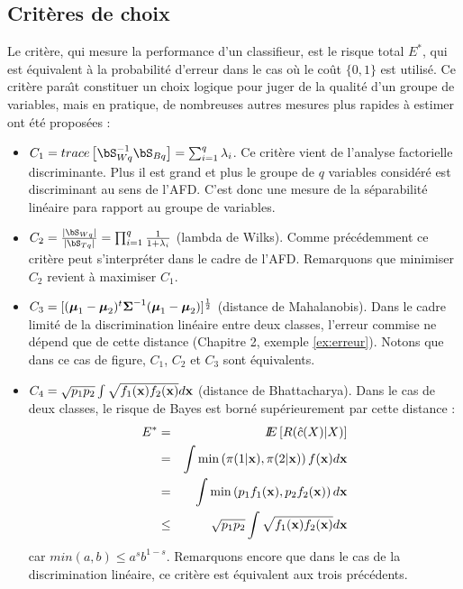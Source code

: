 \subsection{Crit\`eres de choix}
Le crit\`ere, qui mesure la performance d'un classifieur, est le
risque total $E^*$, qui est \'equivalent \`a la probabilit\'e d'erreur 
dans le cas o\`u le co\^ut $\{0,1\}$ est utilis\'e. Ce crit\`ere 
para\^{\i}t constituer un choix logique pour juger de la qualit\'e
d'un groupe de variables, mais en pratique, de nombreuses autres
mesures plus rapides \`a estimer ont \'et\'e propos\'ees :    
\begin{itemize}
\item
$C_1=trace \left [  \bS_{Wq}^{-1} \bS_{Bq} \right ]=\sum_{i=1}^q \lambda_i$. 
Ce crit\`ere vient de l'analyse factorielle discriminante. Plus 
il est grand et plus le groupe de $q$ variables consid\'er\'e est
discriminant au sens de l'AFD. C'est donc une mesure de la s\'eparabilit\'e
lin\'eaire para rapport au groupe de variables. 
\item
$C_2=\frac{|\bS_{Wq}|}{|\bS_{Tq}|}=\prod_{i=1}^{q} \frac{1}{1+\lambda_i}$ (lambda
de Wilks). Comme pr\'ec\'edemment ce crit\`ere peut s'interpr\'eter
dans le cadre de l'AFD. Remarquons que minimiser $C_2$ revient \`a
maximiser $C_1$.
\item 
$C_3=[(\mbox{\boldmath $\mu$}_1 - \mbox{\boldmath $\mu$}_2)^t \mbox{\boldmath $\Sigma$}^{-1} (\mbox{\boldmath $\mu$}_1 - \mbox{\boldmath $\mu$}_2)]^{\frac{1}{2}}$
(distance de Mahalanobis). Dans le cadre limit\'e de la discrimination
lin\'eaire entre deux classes, l'erreur commise ne d\'epend que de cette
distance (Chapitre 2, exemple \ref{ex:erreur}). Notons
que dans ce cas de figure, $C_1$, $C_2$ et $C_3$ sont \'equivalents.
\item
$C_4=\sqrt{p_1 p_2} \int \sqrt{f_1(\mbox{\bf x}) f_2(\mbox{\bf x}) }d\mbox{\bf x}$ (distance de Bhattacharya).
Dans le  cas de deux classes, le risque de Bayes est born\'e sup\'erieurement
par cette distance :
\begin{eqnarray*}
E^* & = &   I\!\!E\left [ R(\hat{c}(X)|X) \right ]  \\
    & = & \int \min \left ( \pi(1 |\mbox{\bf x}) ,\pi(2 |\mbox{\bf x}) \right ) f(\mbox{\bf x}) d\mbox{\bf x} \\
    & = & \int \min \left ( p_1 f_1(\mbox{\bf x}) ,p_2 f_2(\mbox{\bf x}) \right ) d\mbox{\bf x} \\
    & \leq &  \sqrt{p_1 p_2} \int \sqrt{f_1(\mbox{\bf x}) f_2(\mbox{\bf x}) }d\mbox{\bf x}
\end{eqnarray*}
car $min(a,b)\leq a^s b^{1-s}$. Remarquons encore que dans le cas de la discrimination
lin\'eaire, ce crit\`ere est \'equivalent aux trois pr\'ec\'edents.
\end{itemize} 

